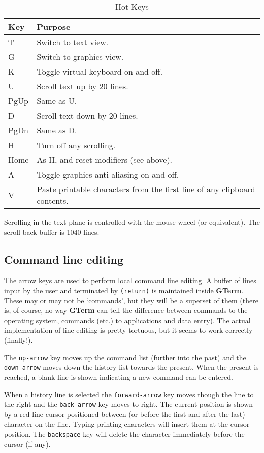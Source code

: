 \documentclass[a4paper,twoside,11pt]{article}
\newcommand{\newpara}{\par\vspace{4mm}\noindent}
\begin{document}
\begin{table}
\centering
\begin{tabular}{|| l | l ||}
\hline
Key & Purpose\\
\hline
T  & Switch to text view.\\
G  & Switch to graphics view.\\
K  & Toggle virtual keyboard on and off.\\
U  & Scroll text up by 20 lines.\\
PgUp  & Same as U.\\
D  & Scroll text down by 20 lines.\\
PgDn  & Same as D.\\
H  & Turn off any scrolling.\\
Home & As H, and reset modifiers (see above). \\
A  & Toggle graphics anti-aliasing on and off.\\
V & Paste printable characters from the first line of any clipboard contents.\\
\hline
\end{tabular}
\caption{Hot Keys}
\label{tab:hotkeys}
\end{table}

\newpara
Scrolling in the text plane is controlled with the mouse wheel (or equivalent). The scroll back buffer is 1040 lines.

\subsection{Command line editing}
The arrow keys are used to perform local command line editing. A buffer of lines input by the user
and terminated by \texttt{(return)} is maintained inside \textbf{GTerm}. These may or may not be `commands', but they will be
a superset of them (there is, of course, no way \textbf{GTerm} can tell the difference between commands to the operating system,
commands (etc.) to applications and data entry). The actual implementation of line editing is pretty tortuous, but it 
seems to work correctly (finally!).

\newpara
The \texttt{up-arrow} key moves up the command list (further into the past) and the \texttt{down-arrow} moves down
the history list towards the present. When the present is reached, a blank line is shown indicating a new command can be
entered.

\newpara
When a history line is selected the \texttt{forward-arrow} key moves though the line to the right and the
\texttt{back-arrow} key moves to right. The current position is shown by a red line cursor positioned between
(or before the first and after the last) character on the line. Typing printing characters will insert them at the
cursor position. The \texttt{backspace} key will delete the character immediately before the cursor (if any).
\end{document}
